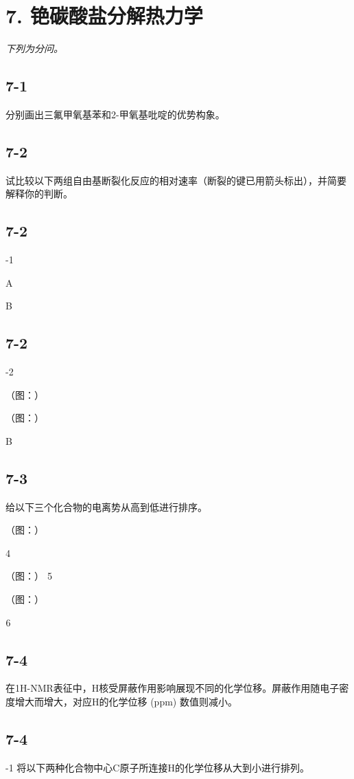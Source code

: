 \section*{7. 铯碳酸盐分解热力学}
\textit{下列为分问。}

\subsection*{7-1}
分别画出三氟甲氧基苯和2-甲氧基吡啶的优势构象。

\subsection*{7-2}
试⽐较以下两组⾃由基断裂化反应的相对速率（断裂的键已⽤箭头标出），并简要解释你的判断。

\subsection*{7-2}
-1

A

B

\subsection*{7-2}
-2

（图：）

（图：）

B

\subsection*{7-3}
给以下三个化合物的电离势从⾼到低进⾏排序。

（图：）



（图：）


（图：）



\subsection*{7-4}
在1H-NMR表征中，H核受屏蔽作⽤影响展现不同的化学位移。屏蔽作⽤随电⼦密度增⼤⽽增⼤，对应H的化学位移 (ppm) 数值则减⼩。

\subsection*{7-4}
-1 将以下两种化合物中⼼C原⼦所连接H的化学位移从⼤到⼩进⾏排列。

